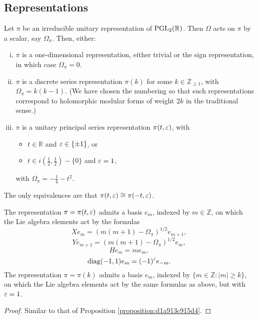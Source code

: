 \documentclass[reqno]{amsart} 
\numberwithin{equation}{section}
\begin{document}
\subsection{Representations}\label{sec:d1a915c57e2f}

\begin{proposition}
  Let $\pi$ be an irreducible unitary representation of $\operatorname{PGL}_2(\mathbb{R})$.  Then $\Omega$ acts on $\pi$ by a scalar, say $\Omega_\pi$.  Then, either:
  \begin{enumerate}[(i)]
  \item $\pi$ is a one-dimensional representation, either trivial or the sign representation, in which case $\Omega_\pi = 0$.
  \item $\pi$ is a discrete series representation $\pi(k)$ for some $k \in \mathbb{Z}_{\geq 1}$, with $\Omega_\pi = k(k-1)$.  (We have chosen the numbering so that such representations correspond to holomorphic modular forms of weight $2 k$ in the traditional sense.)
  \item $\pi$ is a unitary principal series representation $\pi(t,\varepsilon)$, with
    \begin{itemize}
    \item$t \in \mathbb{R}$ and $\varepsilon \in \{\pm 1\}$, or
    \item $t \in i (\tfrac{1}{2}, \tfrac{1}{2} ) - \{0\}$ and $\varepsilon = 1$,
    \end{itemize}
    with $\Omega_\pi = - \tfrac{1}{4} - t^2$.
  \end{enumerate}
  The only equivalences are that $\pi(t,\varepsilon) \cong \pi(-t,\varepsilon)$.

  The representation $\pi = \pi(t,\varepsilon)$ admits a basis $e_m$, indexed by $m \in \mathbb{Z}$, on which the Lie algebra elements act by the formulas
  \begin{equation*}
    X e_m = ( m(m+1) - \Omega_\pi)^{1/2} e_{m+1},
  \end{equation*}
  \begin{equation*}
    Y e_{m+1} = (m(m+1) - \Omega_\pi)^{1/2} e_{m},
  \end{equation*}
  \begin{equation*}
    H e_m = m e_m,
  \end{equation*}
  \begin{equation*}
    \operatorname{diag}(-1,1) e_m = (-1)^{\varepsilon} e_{-m}.
  \end{equation*}
  The representation $\pi = \pi(k)$ admits a basis $e_m$, indexed by $\{m \in \mathbb{Z} : |m| \geq k\}$, on which the Lie algebra elements act by the same formulas as above, but with $\varepsilon = 1$.
\end{proposition}
\begin{proof}
  Similar to that of Proposition \ref{proposition:d1a913c915d4}.
\end{proof}
\end{document}
